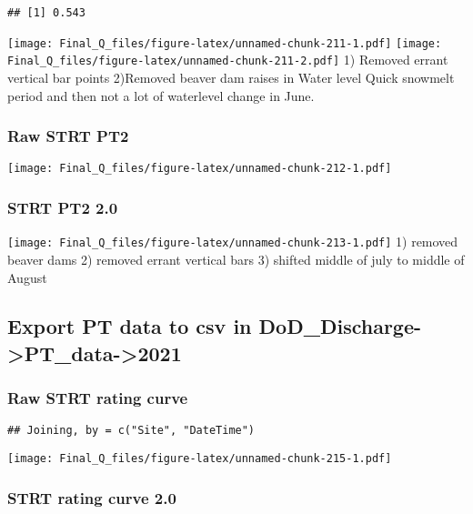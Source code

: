 \documentclass[
]{article}
\begin{document}
\begin{verbatim}
## [1] 0.543
\end{verbatim}

\texttt{[image: Final\_Q\_files/figure-latex/unnamed-chunk-211-1.pdf]}
\texttt{[image: Final\_Q\_files/figure-latex/unnamed-chunk-211-2.pdf]} 1)
Removed errant vertical bar points 2)Removed beaver dam raises in Water
level Quick snowmelt period and then not a lot of waterlevel change in
June.

\hypertarget{raw-strt-pt2}{%
\subsubsection{Raw STRT PT2}\label{raw-strt-pt2}}

\texttt{[image: Final\_Q\_files/figure-latex/unnamed-chunk-212-1.pdf]}

\hypertarget{strt-pt2-2.0-1}{%
\subsubsection{STRT PT2 2.0}\label{strt-pt2-2.0-1}}

\texttt{[image: Final\_Q\_files/figure-latex/unnamed-chunk-213-1.pdf]} 1)
removed beaver dams 2) removed errant vertical bars 3) shifted middle of
july to middle of August

\hypertarget{export-pt-data-to-csv-in-dod_discharge-pt_data-2021-4}{%
\subsection{Export PT data to csv in
DoD\_Discharge-\textgreater PT\_data-\textgreater2021}\label{export-pt-data-to-csv-in-dod_discharge-pt_data-2021-4}}

\hypertarget{raw-strt-rating-curve}{%
\subsubsection{Raw STRT rating curve}\label{raw-strt-rating-curve}}

\begin{verbatim}
## Joining, by = c("Site", "DateTime")
\end{verbatim}

\texttt{[image: Final\_Q\_files/figure-latex/unnamed-chunk-215-1.pdf]}

\hypertarget{strt-rating-curve-2.0}{%
\subsubsection{STRT rating curve 2.0}\label{strt-rating-curve-2.0}}
\end{document}
